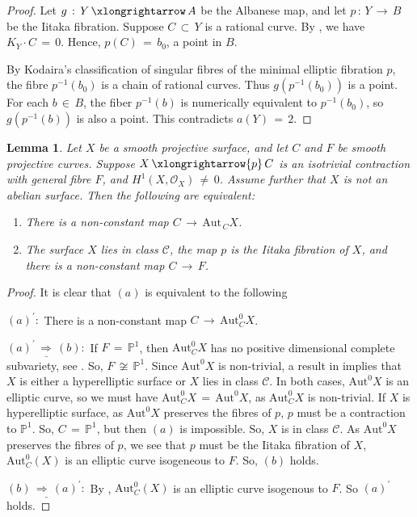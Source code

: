 \documentclass[12pt,reqno]{amsart}
\newtheorem{lemma}{Lemma}[section]
\theoremstyle{definition}
\numberwithin{equation}{section}
\begin{document}
\begin{proof}
Let $g\,:\,Y\,\xlongrightarrow\,A$ be the Albanese map, and let $p\,:\,Y\,\longrightarrow\,B$ be the Iitaka fibration. Suppose $C\,\subset\, Y$ is a rational curve. By \cite[Theorem 1.1]{Lu}, we have $K_{Y}\cdot C\,=\, 0$. Hence, $p(C)\,=\, b_{0}$, a point in $B$. 

By Kodaira's classification of singular fibres of the minimal elliptic fibration $p$, the fibre $p^{-1}(b_{0})$ is a chain of rational curves. Thus $g(p^{-1}(b_{0}))$ is a point. For each $b\,\in\,B$, the fiber $p^{-1}(b)$ is numerically equivalent to $p^{-1}(b_{0})$, so $g(p^{-1}(b))$ is also a point. This contradicts $a(Y)\,=\,2$.
\end{proof}


\begin{lemma}\label{equivalence}
Let $X$ be a smooth projective surface, and let  $C$ and $F$ be smooth projective curves. Suppose $X\,\xlongrightarrow{p}\,C$ is an isotrivial contraction with general fibre $F$, and  $H^1(X, \mathcal{O}_X)\,\neq \,0$. Assume further that $X$ is not an abelian surface. Then the following are equivalent:
\begin{enumerate}
\item[(a)] There is a non-constant map $C\,\longrightarrow\, \textrm{Aut}_{\,C}X$. 
\item[(b)] The surface $X$ lies in class $\mathcal{C}$, the map $p$ is the Iitaka fibration of $X$, and there is a non-constant map $C\,\longrightarrow\, F$.
\end{enumerate}
\end{lemma}

\begin{proof}
It is clear that
$(a)$ is equivalent to the following

$(a)^{\prime}:$ There is a non-constant map $C\,\longrightarrow\,\textrm{Aut}_{C}^0X$.

$\underline{(a)^{\prime}\,\Rightarrow\,(b):}$ If $F\,=\, \mathbb{P}^{1}$, then $\textrm{Aut}^{0}_{C}X$ has no positive dimensional complete subvariety, see \cite{Mar}. So, $F\,\not \cong \, \mathbb{P}^{1}$. Since $\textrm{Aut}^{0}X$ is non-trivial, a result in \cite{Fon} implies that $X$ is either a hyperelliptic surface or $X$ lies in class $\mathcal{C}$. In both cases, $\textrm{Aut}^{0}X$ is an elliptic curve, so we must have $\textrm{Aut}^{0}_{C}X \,=\,\textrm{Aut}^{0}X$, as $\textrm{Aut}^{0}_{C}X$ is non-trivial. If $X$ is hyperelliptic surface, as $\textrm{Aut}^{0}X$ preserves the fibres of $p$, $p$ must be a contraction to $\mathbb{P}^1$. So, $C\,=\,\mathbb{P}^1$, but then $(a)$ is impossible. So, $X$ is in class $\mathcal{C}$. As $\textrm{Aut}^{0}X$ preserves the fibres of $p$, we see that $p$ must be the Iitaka fibration of $X$, $\textrm{Aut}^{0}_{C}(X)$ is an elliptic curve isogeneous to $F$. So, $(b)$ holds.

$\underline{(b)\,\Rightarrow\,(a)^{\prime}:}$ By \cite{Fon}, $\textrm{Aut}^{0}_{C}(X)$ is an elliptic curve isogenous to $F$. So $(a)^{\prime}$ holds.
\end{proof}
\end{document}
